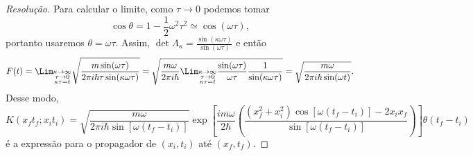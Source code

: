 \begin{proof}[Resolução]
   Para calcular o limite, como \(\tau \to 0\) podemos tomar
   \begin{equation*}
       \cos\theta = 1 - \frac12 \omega^2 \tau^2 \simeq \cos(\omega \tau),
   \end{equation*}
   portanto usaremos \(\theta = \omega \tau\). Assim, \(\det{\Lambda_\kappa} = \frac{\sin(\kappa \omega \tau)}{\sin(\omega \tau)}\) e então
   \begin{equation*}
      F(t) 
      = \Lim_{\substack{\kappa \to \infty\\ \tau \to 0\\ \kappa \tau = t}}{\sqrt{\frac{m \sin(\omega \tau)}{2\pi i \hbar \tau \sin(\kappa \omega \tau)}}} = \sqrt{\frac{m \omega}{2\pi i \hbar} \Lim_{\substack{\kappa \to \infty\\ \tau \to 0\\ \kappa \tau = t}}{\frac{\sin(\omega \tau)}{\omega \tau} \frac{1}{\sin(\kappa \omega \tau)}}} = \sqrt{\frac{m \omega}{2 \pi i \hbar \sin(\omega t)}}.
   \end{equation*}
   Desse modo,
   \begin{equation*}
      K(x_ft_f; x_it_i) =\sqrt{\frac{m \omega}{2 \pi i \hbar \sin[\omega (t_f - t_i)]}}\exp\left[\frac{i m \omega}{2 \hbar}\left(\frac{(x_f^2 + x_i^2) \cos[\omega (t_f - t_i)] - 2x_i x_f}{\sin[\omega (t_f - t_i)]}\right)\right]\theta(t_f - t_i)
   \end{equation*}
   é a expressão para o propagador de \((x_i,t_i)\) até \((x_f, t_f)\).
\end{proof}
